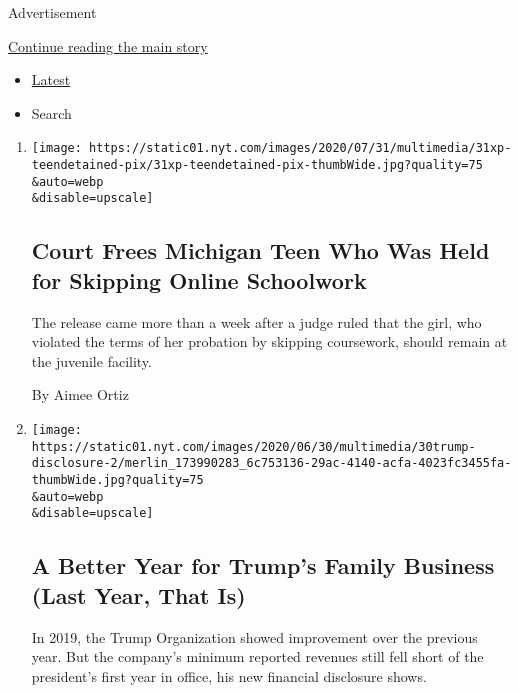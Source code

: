 Advertisement

\protect\hyperlink{after-mid1}{Continue reading the main story}

\begin{itemize}
\tightlist
\item
  \protect\hyperlink{stream-panel}{Latest}
\item
  Search
\end{itemize}

\begin{enumerate}
\def\labelenumi{\arabic{enumi}.}
\item
  \href{/2020/07/31/us/michigan-teen-homework-release.html}{}

  \texttt{[image: https://static01.nyt.com/images/2020/07/31/multimedia/31xp-teendetained-pix/31xp-teendetained-pix-thumbWide.jpg?quality=75\\\&auto=webp\\\&disable=upscale]}

  \hypertarget{court-frees-michigan-teen-who-was-held-for-skipping-online-schoolwork}{%
  \subsection{Court Frees Michigan Teen Who Was Held for Skipping Online
  Schoolwork}\label{court-frees-michigan-teen-who-was-held-for-skipping-online-schoolwork}}

  The release came more than a week after a judge ruled that the girl,
  who violated the terms of her probation by skipping coursework, should
  remain at the juvenile facility.

  By Aimee Ortiz
\item
  \href{/2020/07/31/business/trump-financial-disclosure.html}{}

  \texttt{[image: https://static01.nyt.com/images/2020/06/30/multimedia/30trump-disclosure-2/merlin\_173990283\_6c753136-29ac-4140-acfa-4023fc3455fa-thumbWide.jpg?quality=75\\\&auto=webp\\\&disable=upscale]}

  \hypertarget{a-better-year-for-trumps-family-business-last-year-that-is}{%
  \subsection{A Better Year for Trump's Family Business (Last Year, That
  Is)}\label{a-better-year-for-trumps-family-business-last-year-that-is}}

  In 2019, the Trump Organization showed improvement over the previous
  year. But the company's minimum reported revenues still fell short of
  the president's first year in office, his new financial disclosure
  shows.


\end{enumerate}
